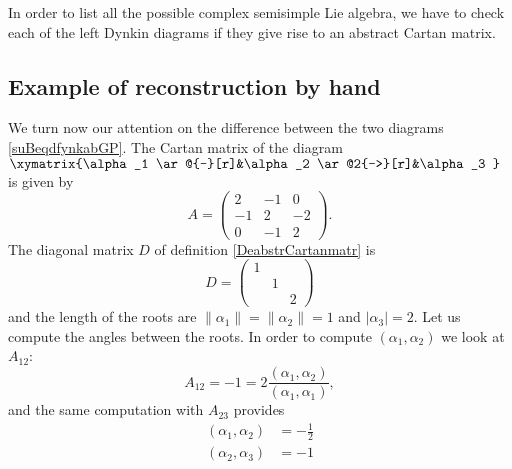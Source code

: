 In order to list all the possible complex semisimple Lie algebra, we have to check each of the left Dynkin diagrams if they give rise to an abstract Cartan matrix.

\subsection{Example of reconstruction by hand}
\label{subsecRecbyhanfd}

We turn now our attention on the difference between the two diagrams \eqref{suBeqdfynkabGP}. The Cartan matrix of the diagram $
        \xymatrix{%
        \alpha_1 \ar@{-}[r]&\alpha_2 \ar@2{->}[r]&\alpha_3
        }   $ is given by
        \begin{equation}
        A=\begin{pmatrix}
            2    &   -1    &   0    \\
            -1    &   2    &   -2    \\
            0    &   -1    &   2
       \end{pmatrix}.
        \end{equation}
The diagonal matrix \( D\) of definition \ref{DeabstrCartanmatr} is
\begin{equation}
    D=\begin{pmatrix}
        1    &       &       \\
            &   1    &       \\
            &       &   2
    \end{pmatrix}
\end{equation}
and the length of the roots are \( \| \alpha_1 \|=\| \alpha_2 \|=1\) and \( | \alpha_3 |=2\). Let us compute the angles between the roots. In order to compute \( (\alpha_1,\alpha_2)\) we look at \( A_{12}\):
\begin{equation}
    A_{12}=-1=2\frac{ (\alpha_1,\alpha_2) }{ (\alpha_1,\alpha_1) },
\end{equation}
and the same computation with \( A_{23}\) provides
\begin{subequations}
    \begin{align}
        (\alpha_1,\alpha_2)&=-\frac{ 1 }{2}\\
        (\alpha_2,\alpha_3)&=-1
    \end{align}
\end{subequations}
